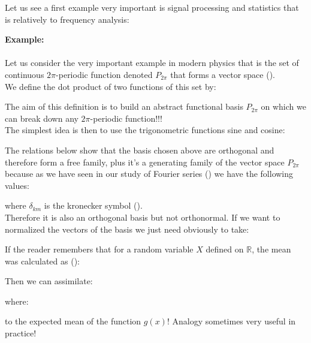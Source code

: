 	Let us see a first example very important is signal processing and statistics that is relatively to frequency analysis:
	\begin{tcolorbox}[colframe=black,colback=white,sharp corners]
	\textbf{{\Large {}}Example:}\\\\
	Let us consider the very important example in modern physics that is the set of continuous $2\pi$-periodic function denoted $P_{2\pi}$ that forms a vector space ().\\
	
	We define the dot product of two functions of this set by:
	
	The aim of this definition is to build an abstract functional basis $P_{2\pi}$ on which we can break down any $2\pi$-periodic function!!!\\
	
	The simplest idea is then to use the trigonometric functions sine and cosine:
	
	The relations below show that the basis chosen above are orthogonal and therefore form a free family, plus it's a generating family of the vector space $P_{2\pi}$ because as we have seen in our study of Fourier series () we have the following values:
	
	where $\delta_{km}$ is the kronecker symbol ().\\
	
	Therefore it is also an orthogonal basis but not orthonormal. If we want to normalized the vectors of the basis we just need obviously to take:
	
	\end{tcolorbox}
	\begin{tcolorbox}[title=Remark,arc=10pt,breakable,drop lifted shadow,
  skin=enhanced,
  skin first is subskin of={enhancedfirst}{arc=10pt,no shadow},
  skin middle is subskin of={enhancedmiddle}{arc=10pt,no shadow},
  skin last is subskin of={enhancedlast}{drop lifted shadow}]
	If the reader remembers that for a random variable $X$ defined on $\mathbb{R}$, the mean was calculated as ():
	
	Then we can assimilate:
	
	where:
	
	to the expected mean of the function $g(x)$! Analogy sometimes very useful in practice!
	\end{tcolorbox}

